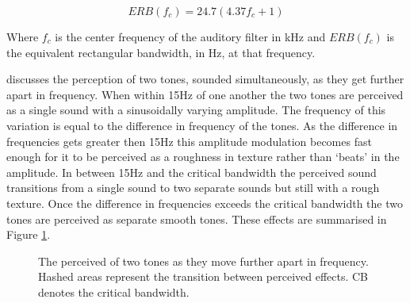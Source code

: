 		\begin{equation}
			ERB(f_{c}) = 24.7(4.37f_{c} + 1)
			\label{eq:ERB}
		\end{equation}

		Where $f_{c}$ is the center frequency of the auditory filter in kHz and $ERB(f_{c})$ is the equivalent
		rectangular bandwidth, in Hz, at that frequency.

		\citet{howard2009acoustics} discusses the perception of two tones, sounded simultaneously, as they get
		further apart in frequency. When within 15Hz of one another the two tones are perceived as a single sound
		with a sinusoidally varying amplitude. The frequency of this variation is equal to the difference in
		frequency of the tones. As the difference in frequencies gets greater then 15Hz this amplitude modulation
		becomes fast enough for it to be perceived as a roughness in texture rather than `beats' in the amplitude.
		In between 15Hz and the critical bandwidth the perceived sound transitions from a single sound to two
		separate sounds but still with a rough texture. Once the difference in frequencies exceeds the critical
		bandwidth the two tones are perceived as separate smooth tones. These effects are summarised in Figure
		\ref{fig:ToneSeparation}.

		\begin{figure}[h!]
			\centering
			\caption{The perceived of two tones as they move further apart in frequency. Hashed areas represent
				 the transition between perceived effects. CB denotes the critical bandwidth.}
			\label{fig:ToneSeparation}
		\end{figure}

